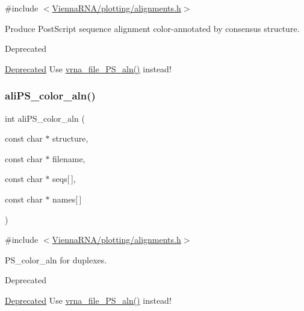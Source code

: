 {\ttfamily \#include $<$\mbox{\hyperlink{plotting_2alignments_8h}{Vienna\+R\+N\+A/plotting/alignments.\+h}}$>$}



Produce Post\+Script sequence alignment color-\/annotated by consensus structure. 

\begin{DoxyRefDesc}{Deprecated}
\item[\mbox{\hyperlink{deprecated__deprecated000169}{Deprecated}}]Use \mbox{\hyperlink{group__alignment__plots_ga3bb7409f5b73c2273f9f76cf8b754034}{vrna\+\_\+file\+\_\+\+P\+S\+\_\+aln()}} instead!\end{DoxyRefDesc}
\mbox{\label{group__plotting__utils__deprecated_gaab48d4dac655d688abe921389ac2847c}} 
\subsubsection{\texorpdfstring{aliPS\_color\_aln()}{aliPS\_color\_aln()}}
{\footnotesize\ttfamily int ali\+P\+S\+\_\+color\+\_\+aln (\begin{DoxyParamCaption}\item[{const char $\ast$}]{structure,  }\item[{const char $\ast$}]{filename,  }\item[{const char $\ast$}]{seqs\mbox{[}$\,$\mbox{]},  }\item[{const char $\ast$}]{names\mbox{[}$\,$\mbox{]} }\end{DoxyParamCaption})}



{\ttfamily \#include $<$\mbox{\hyperlink{plotting_2alignments_8h}{Vienna\+R\+N\+A/plotting/alignments.\+h}}$>$}



P\+S\+\_\+color\+\_\+aln for duplexes. 

\begin{DoxyRefDesc}{Deprecated}
\item[\mbox{\hyperlink{deprecated__deprecated000170}{Deprecated}}]Use \mbox{\hyperlink{group__alignment__plots_ga3bb7409f5b73c2273f9f76cf8b754034}{vrna\+\_\+file\+\_\+\+P\+S\+\_\+aln()}} instead!\end{DoxyRefDesc}
\mbox{\label{group__plotting__utils__deprecated_gaf4b9173e7d3fd361c3c85e6def194123}} 
